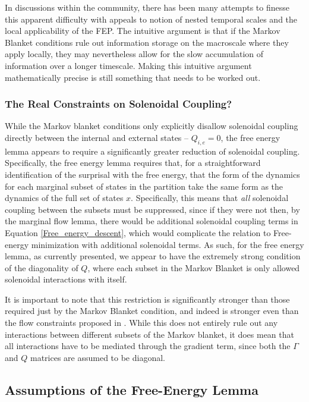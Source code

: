 In discussions within the community, there has been many attempts to finesse this apparent difficulty with appeals to notion of nested temporal scales and the local applicability of the FEP. The intuitive argument is that if the Markov Blanket conditions rule out information storage on the macroscale where they apply locally, they may nevertheless allow for the slow accumulation of information over a longer timescale. Making this intuitive argument mathematically precise is still something that needs to be worked out.


\subsubsection{The Real Constraints on Solenoidal Coupling?}

While the Markov blanket conditions only explicitly disallow solenoidal coupling directly between the internal and external states -- $Q_{i,e} = 0$, the free energy lemma appears to require a significantly greater reduction of solenoidal coupling. Specifically, the free energy lemma requires that, for a straightforward identification of the surprisal with the free energy, that the form of the dynamics for each marginal subset of states in the partition take the same form as the dynamics of the full set of states $x$. Specifically, this means that \emph{all} solenoidal coupling between the subsets must be suppressed, since if they were not then, by the marginal flow lemma, there would be additional solenoidal coupling terms in Equation \ref{Free_energy_descent}, which would complicate the relation to Free-energy minimization with additional solenoidal terms. As such, for the free energy lemma, as currently presented, we appear to have the extremely strong condition of the diagonality of $Q$, where each subset in the Markov Blanket is only allowed solenoidal interactions with itself.

It is important to note that this restriction is significantly stronger than those required just by the Markov Blanket condition, and indeed is stronger even than the flow constraints proposed in \citet{friston2020some}. While this does not entirely rule out any interactions between different subsets of the Markov blanket, it does mean that all interactions have to be mediated through the gradient term, since both the $\Gamma$ and $Q$ matrices are assumed to be diagonal.

\subsection{Assumptions of the Free-Energy Lemma}
